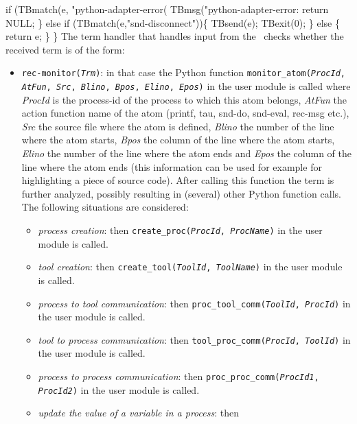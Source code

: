   if (TBmatch(e, "python-adapter-error(%
    TBmsg("python-adapter-error: %
    return NULL;
  \} else if (TBmatch(e,"snd-disconnect"))\{
    TBsend(e);
    TBexit(0);
  \} else \{
    return e;
  \}
\}
\nwendcode{}\nwdocspar
The term handler that handles input from the \TB\ checks whether the
received term is of the form:
\begin{itemize}
\item \texttt{rec-monitor(\emph{Trm})}: in that case the Python
  function \texttt{monitor\_atom(\emph{ProcId}, \emph{AtFun},
    \emph{Src}, \emph{Blino}, \emph{Bpos}, \emph{Elino}, \emph{Epos})}
  in the user module is called where \emph{ProcId} is the process-id
  of the process to which this atom belongs, \emph{AtFun} the action
  function name of the atom (printf, tau, snd-do, snd-eval, rec-msg
  etc.), \emph{Src} the source file where the atom is defined,
  \emph{Blino} the number of the line where the atom starts,
  \emph{Bpos} the column of the line where the atom starts,
  \emph{Elino} the number of the line where the atom ends and
  \emph{Epos} the column of the line where the atom ends (this
  information can be used for example for highlighting a piece of
  source code). After calling this function the term is further
  analyzed, possibly resulting in (several) other Python function
  calls. The following situations are considered:
  \begin{itemize}
  \item \emph{process creation}: then \texttt{create\_proc(\emph{ProcId},
      \emph{ProcName})} in the user module is called.
  \item \emph{tool creation}: then \texttt{create\_tool(\emph{ToolId},
      \emph{ToolName})} in the user module is called.
  \item \emph{process to tool communication}: then 
    \texttt{proc\_tool\_comm(\emph{ToolId}, \emph{ProcId})} in the
    user module is called.
  \item \emph{tool to process communication}: then 
    \texttt{tool\_proc\_comm(\emph{ProcId}, \emph{ToolId})} in the
    user module is called.
  \item \emph{process to process communication}: then 
    \texttt{proc\_proc\_comm(\emph{ProcId1}, \emph{ProcId2})} in the
    user module is called.
  \item \emph{update the value of a variable in a process}: then 

\end{itemize}
\end{itemize}

